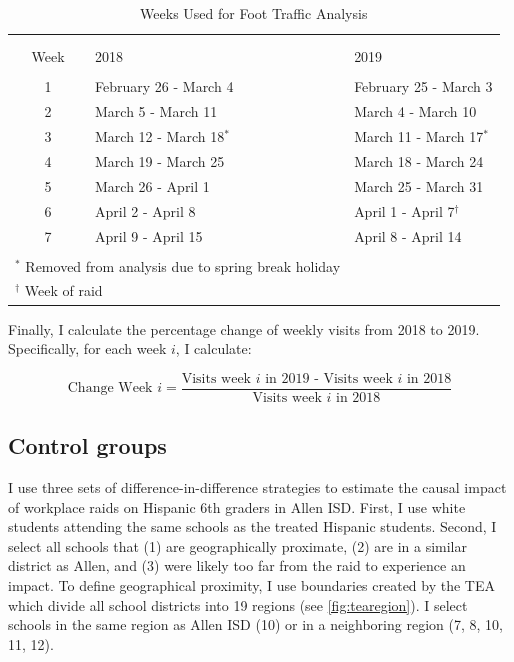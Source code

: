 \documentclass[hidelinks,twoside]{article}
\begin{document}
\vspace{2em}
\begin{table}[!htbp] \centering 
  \caption{Weeks Used for Foot Traffic Analysis} 
  \label{} 
\begin{tabular}{@{\extracolsep{5pt}}cll} 
\\[-1.8ex]\hline 
\hline \\[-1.8ex] 
\\Week & 2018 & 2019 \\
\hline \\[-1.8ex] 
1 & February 26 - March 4 & February 25 - March 3 \\ 
2 & March 5 - March 11 & March 4 - March 10 \\ 
3 & March 12 - March 18$^*$ & March 11 - March 17$^*$ \\ 
4 & March 19 - March 25 & March 18 - March 24 \\ 
5 & March 26 - April 1 & March 25 - March 31 \\
6 & April 2 - April 8 & April 1 - April 7$^\dag$ \\
7 & April 9 - April 15 & April 8 - April 14 \\
\hline 
\hline \\[-1.8ex] 
\multicolumn{2}{l}{$^{*}$ Removed from analysis due to spring break holiday} & \\
\multicolumn{2}{l}{$^{\dag}$ Week of raid} & \\
\end{tabular} 
\end{table} 

Finally, I calculate the percentage change of weekly visits from 2018 to 2019. Specifically, for each week $i$, I calculate:

\begin{equation*}
    \text{Change Week $i$} = \frac{\text{Visits week $i$ in 2019 - Visits week $i$ in 2018}}{\text{Visits week $i$ in 2018}}
\end{equation*}


\subsection*{Control groups}

I use three sets of difference-in-difference strategies to estimate the causal impact of workplace raids on Hispanic 6th graders in Allen ISD. First, I use white students attending the same schools as the treated Hispanic students. Second, I select all schools that (1) are geographically proximate, (2) are in a similar district as Allen, and (3) were likely too far from the raid to experience an impact. To define geographical proximity, I use boundaries created by the TEA which divide all school districts into 19 regions (see \autoref{fig:tearegion}). I select schools in the same region as Allen ISD (10) or in a neighboring region (7, 8, 10, 11, 12). 
\end{document}
